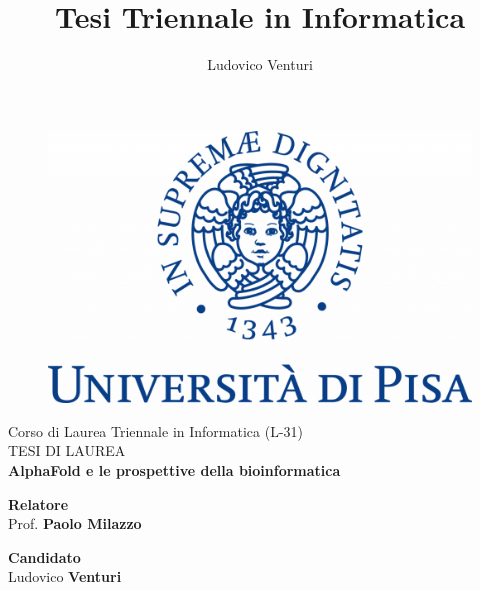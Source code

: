 \documentclass[12pt]{report}
\begin{document}
	
\author{Ludovico Venturi}
\title{Tesi Triennale in Informatica}
	
\begin{titlepage}
	\begin{figure}
		\centering\includegraphics[scale=0.2] {images/UNIPI_Logo.png}
	\end{figure}
	
	\begin{center}
		{\LARGE{ Corso di Laurea Triennale in Informatica (L-31) \\}}
		\vspace{2cm}
		{\Large { TESI DI LAUREA }}\\
		\vspace{2cm}
		{\LARGE { \textbf{AlphaFold e le prospettive della bioinformatica} }}
	\end{center}
	
	\vspace{2cm}
	
	\begin{minipage}[t]{0.6\textwidth}
		{\large{\textbf{Relatore}\\ Prof. \textbf{Paolo Milazzo}}}
		\vspace{0.5cm}
	\end{minipage}\hfill\begin{minipage}[t]{0.47\textwidth}\raggedleft
		{\large{\textbf{Candidato} \\ Ludovico \textbf{Venturi}\\ }}
	\end{minipage}
	
	\vspace{25mm}
	
\end{titlepage}


\tableofcontents
\clearpage




\printbibliography
\end{document}
